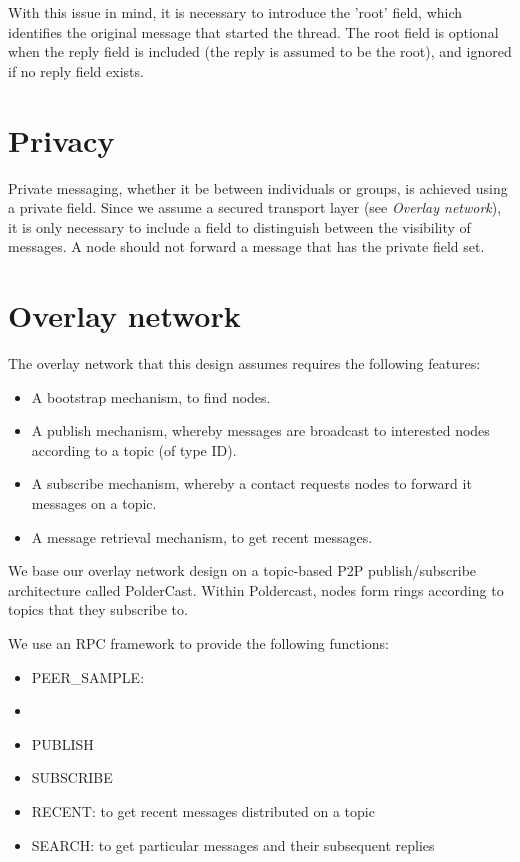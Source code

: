 \documentclass[10pt,a4paper,onecolumn]{article}
\begin{document}
With this issue in mind, it is necessary to introduce the 'root' field, which identifies the original message that started the thread. The root field is  optional when the reply field is included (the reply is assumed to be the root), and ignored if no reply field exists.


\section{Privacy}
Private messaging, whether it be between individuals or groups, is achieved using a private field. Since we assume a secured transport layer (see \textit{Overlay network}), it is only necessary to include a field to distinguish between the visibility of messages. A node should not forward a message that has the private field set. 


\section{Overlay network}
The overlay network that this design assumes requires the following features:
\begin{itemize}
\item A bootstrap mechanism, to find nodes.
\item A publish mechanism, whereby messages are broadcast to interested nodes according to a topic (of type ID).
\item A subscribe mechanism, whereby a contact requests nodes to forward it messages on a topic.
\item A message retrieval mechanism, to get recent messages. 
\end{itemize}

We base our overlay network design on a topic-based P2P publish/subscribe architecture called PolderCast. Within Poldercast, nodes form rings according to topics that they subscribe to. 

We use an RPC framework to provide the following functions:
\begin{itemize}
\item PEER_SAMPLE:
\item  
\item PUBLISH
\item SUBSCRIBE
\item RECENT: to get recent messages distributed on a topic
\item SEARCH: to get particular messages and their subsequent replies
\end{itemize}
\end{document}
